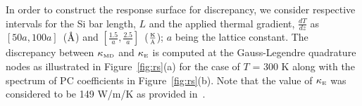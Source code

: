In order to construct the response surface for discrepancy, we consider respective intervals for the Si bar length,
$L$ and the applied thermal gradient, $\frac{dT}{dz}$ as $[50a,100a]$~($\mbox{\normalfont\AA}$) and
 $[\frac{1.5}{a},\frac{2.5}{a}]$~($\frac{\mbox{\tiny{K}}}{\tiny{\mbox{\normalfont\AA}}}$); $a$ being the lattice constant. The 
 discrepancy between $\kappa_{\mbox{\tiny{MD}}}$ and $\kappa_{\mbox{\tiny{E}}}$ is computed at the
 Gauss-Legendre quadrature nodes as illustrated in Figure~\ref{fig:rs}(a) for the case of $T$ = 300 K
  along with the spectrum of PC coefficients in Figure~\ref{fig:rs}(b). Note that the value of 
  $\kappa_{\mbox{\tiny{E}}}$ was considered to be 149 W/m/K as provided in~\cite{Shanks:1963}.





































